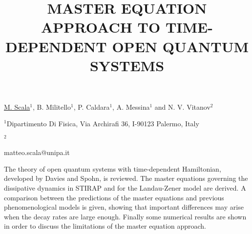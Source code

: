 \title{MASTER EQUATION APPROACH TO TIME-DEPENDENT OPEN QUANTUM SYSTEMS}

\underline{M. Scala}$^{1}$, B. Militello$^{1}$, P. Caldara$^{1}$, A. Messina$^{1}$ and N. V. Vitanov$^{2}$     

{\normalsize{\vspace{-4mm}
$^{1}$Dipartimento Di Fisica,
Via Archirafi 36,
I-90123 Palermo,
Italy

\vspace{-4mm}
$^{2}$ \unisofia

\email matteo.scala@unipa.it}}

The theory of open quantum systems with time-dependent Hamiltonian, developed by Davies and Spohn, is reviewed. The master equations governing the dissipative dynamics in STIRAP and for the Landau-Zener model are derived. A comparison between the predictions of the master equations and previous phenomenological models is given, showing that important differences may arise when the decay rates are large enough. Finally some numerical results are shown in order to discuss the limitations of the master equation approach.

\vspace{\baselineskip} 